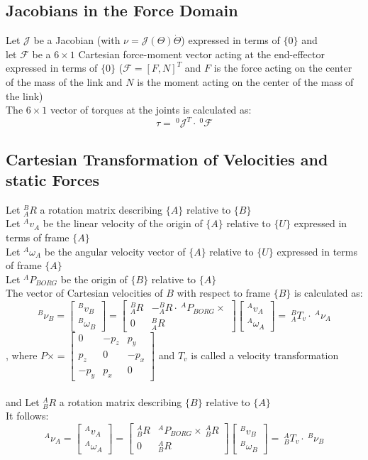 \documentclass[10pt,a4paper]{article}
\newcommand{\vect}[1]{\ensuremath{\begin{bmatrix}#1\end{bmatrix}}}
\begin{document}
\subsection{Jacobians in the Force Domain}
Let $\mathcal{J}$ be a Jacobian (with $\nu  = \mathcal{J}(\Theta)\dot \Theta$) expressed in terms of $\{0\}$ and \\
let $\mathcal{F}$ be a $6 \times 1$ Cartesian force-moment vector acting at the end-effector expressed in terms of $\{0\}$ ($\mathcal{F} = [F, N]^T$ and $F$ is the force acting on the center of the mass of the link and $N$ is the moment acting on the center of the mass of the link)\\
The $6 \times 1$ vector of torques at the joints is calculated as:
$$
	\tau = ~^0\mathcal{J}^T ⋅ ~^0\mathcal{F}
$$

\subsection{Cartesian Transformation of Velocities and static Forces}
Let $^{B}_AR$ a rotation matrix describing $\{A\}$ relative to $\{B\}$ \\
Let $^Av_A$ be the linear velocity of the origin of $\{A\}$ relative to $\{U\}$ expressed in terms of frame $\{A\}$ \\
Let $^A\omega_A$ be the angular velocity vector of $\{A\}$ relative to $\{U\}$ expressed in terms of frame $\{A\}$ \\
Let $^AP_{BORG}$ be the origin of $\{B\}$ relative to $\{A\}$ \\
The vector of Cartesian velocities of $B$ with respect to frame $\{B\}$ is calculated as:
$$
	^B\nu_B = \vect{^Bv_B \\ ^B\omega_B} = \begin{bmatrix}
		^B_AR & -^B_AR ⋅ ~^AP_{BORG}\times \\
		0 & ^B_AR
	\end{bmatrix} \vect{^Av_A \\ ^A\omega_A} = ~^B_AT_v ⋅ ~^A\nu_A
$$
, where
$P\times = \begin{bmatrix}
	0 & -p_z & p_y \\
	p_z & 0 & -p_x \\
	-p_y & p_x & 0
\end{bmatrix}$ and $T_v$ is called a velocity transformation \\
\\

and Let $^{A}_BR$ a rotation matrix describing $\{B\}$ relative to $\{A\}$ \\
It follows:
$$
	^A\nu_A = \vect{^Av_A \\ ^A\omega_A} = \begin{bmatrix}
		^A_BR & ^AP_{BORG} \times ~^A_BR \\
		0 & ^A_BR
	\end{bmatrix} \vect{^Bv_B \\ ^B\omega_B} = ~^A_BT_v ⋅ ~^B\nu_B
$$
\\
\end{document}
